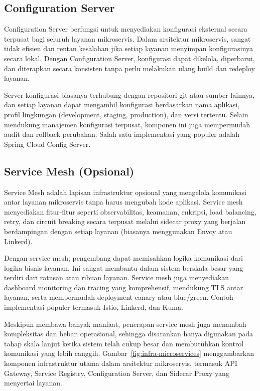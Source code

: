\subsection{Configuration Server}

Configuration Server berfungsi untuk menyediakan konfigurasi eksternal secara terpusat bagi seluruh layanan mikroservis. Dalam arsitektur mikroservis, sangat tidak efisien dan rentan kesalahan jika setiap layanan menyimpan konfigurasinya secara lokal. Dengan Configuration Server, konfigurasi dapat dikelola, diperbarui, dan diterapkan secara konsisten tanpa perlu melakukan ulang build dan redeploy layanan.

Server konfigurasi biasanya terhubung dengan repositori git atau sumber lainnya, dan setiap layanan dapat mengambil konfigurasi berdasarkan nama aplikasi, profil lingkungan (development, staging, production), dan versi tertentu. Selain mendukung manajemen konfigurasi terpusat, komponen ini juga mempermudah audit dan rollback perubahan. Salah satu implementasi yang populer adalah Spring Cloud Config Server.

\subsection{Service Mesh (Opsional)}

Service Mesh adalah lapisan infrastruktur opsional yang mengelola komunikasi antar layanan mikroservis tanpa harus mengubah kode aplikasi. Service mesh menyediakan fitur-fitur seperti observabilitas, keamanan, enkripsi, load balancing, retry, dan circuit breaking secara terpusat melalui sidecar proxy yang berjalan berdampingan dengan setiap layanan (biasanya menggunakan Envoy atau Linkerd).

Dengan service mesh, pengembang dapat memisahkan logika komunikasi dari logika bisnis layanan. Ini sangat membantu dalam sistem berskala besar yang terdiri dari ratusan atau ribuan layanan. Service mesh juga menyediakan dashboard monitoring dan tracing yang komprehensif, mendukung TLS antar layanan, serta mempermudah deployment canary atau blue/green. Contoh implementasi populer termasuk Istio, Linkerd, dan Kuma.

Meskipun membawa banyak manfaat, penerapan service mesh juga menambah kompleksitas dan beban operasional, sehingga disarankan hanya digunakan pada tahap skala lanjut ketika sistem telah cukup besar dan membutuhkan kontrol komunikasi yang lebih canggih. Gambar~\ref{fig:infra-microservices} menggambarkan komponen infrastruktur utama dalam arsitektur mikroservis, termasuk API Gateway, Service Registry, Configuration Server, dan Sidecar Proxy yang menyertai layanan.

